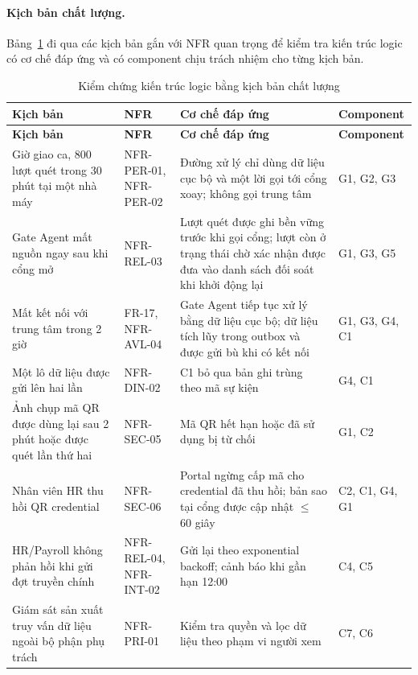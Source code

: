 \paragraph{Kịch bản chất lượng.} Bảng~\ref{tab:quality-scenarios} đi qua các kịch bản gắn với NFR quan trọng để kiểm tra kiến trúc logic có cơ chế đáp ứng và có component chịu trách nhiệm cho từng kịch bản.

\begingroup
\small
\renewcommand{\arraystretch}{1.3}
\begin{longtable}{|>{\raggedright\arraybackslash}p{4.3cm}|>{\raggedright\arraybackslash}p{2.2cm}|>{\raggedright\arraybackslash}p{6.0cm}|>{\raggedright\arraybackslash}p{2.3cm}|}
\caption{Kiểm chứng kiến trúc logic bằng kịch bản chất lượng}\label{tab:quality-scenarios}\\
\hline
\textbf{Kịch bản} & \textbf{NFR} & \textbf{Cơ chế đáp ứng} & \textbf{Component} \\
\hline
\endfirsthead
\hline
\textbf{Kịch bản} & \textbf{NFR} & \textbf{Cơ chế đáp ứng} & \textbf{Component} \\
\hline
\endhead
\hline
\endfoot
\endlastfoot
Giờ giao ca, 800 lượt quét trong 30 phút tại một nhà máy & NFR-PER-01, NFR-PER-02 & Đường xử lý chỉ dùng dữ liệu cục bộ và một lời gọi tới cổng xoay; không gọi trung tâm & G1, G2, G3 \\
\hline
Gate Agent mất nguồn ngay sau khi cổng mở & NFR-REL-03 & Lượt quét được ghi bền vững trước khi gọi cổng; lượt còn ở trạng thái chờ xác nhận được đưa vào danh sách đối soát khi khởi động lại & G1, G3, G5 \\
\hline
Mất kết nối với trung tâm trong 2 giờ & FR-17, NFR-AVL-04 & Gate Agent tiếp tục xử lý bằng dữ liệu cục bộ; dữ liệu tích lũy trong outbox và được gửi bù khi có kết nối & G1, G3, G4, C1 \\
\hline
Một lô dữ liệu được gửi lên hai lần & NFR-DIN-02 & C1 bỏ qua bản ghi trùng theo mã sự kiện & G4, C1 \\
\hline
Ảnh chụp mã QR được dùng lại sau 2 phút hoặc được quét lần thứ hai & NFR-SEC-05 & Mã QR hết hạn hoặc đã sử dụng bị từ chối & G1, C2 \\
\hline
Nhân viên HR thu hồi QR credential & NFR-SEC-06 & Portal ngừng cấp mã cho credential đã thu hồi; bản sao tại cổng được cập nhật $\le$ 60 giây & C2, C1, G4, G1 \\
\hline
HR/Payroll không phản hồi khi gửi đợt truyền chính & NFR-REL-04, NFR-INT-02 & Gửi lại theo exponential backoff; cảnh báo khi gần hạn 12:00 & C4, C5 \\
\hline
Giám sát sản xuất truy vấn dữ liệu ngoài bộ phận phụ trách & NFR-PRI-01 & Kiểm tra quyền và lọc dữ liệu theo phạm vi người xem & C7, C6 \\
\hline
\end{longtable}
\endgroup

